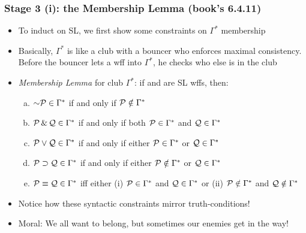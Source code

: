 \begin{frame}
\frametitle{Stage 3 (i): the Membership Lemma (book's 6.4.11)}

\begin{itemize}[<+->]

\item To induct on SL, we first show some constraints on $\Gamma^{\ast}$ membership

\item Basically, $\Gamma^{\ast}$ is like a club with a bouncer who enforces maximal consistency. Before the bouncer lets a wff into $\Gamma^{\ast}$, he checks who else is in the club 

\item \emph{Membership Lemma} for club $\Gamma^{\ast}$: if  and  are SL wffs, then:

\begin{enumerate}[a.)]

\item $\enot \metav{P} \in \Gamma^{\ast}$ if and only if $\mathcal{P} \notin \Gamma^{\ast}$

\item $\mathcal{P} \,\&\, \mathcal{Q} \in \Gamma^{\ast}$ if and only if both $\mathcal{P}\in \Gamma^{\ast}$ and $\mathcal{Q}\in \Gamma^{\ast}$

\item $\mathcal{P} \vee \mathcal{Q} \in \Gamma^{\ast}$ if and only if either $\mathcal{P}\in \Gamma^{\ast}$ or $\mathcal{Q}\in \Gamma^{\ast}$

\item $\mathcal{P} \supset \mathcal{Q} \in \Gamma^{\ast}$ if and only if either $\mathcal{P}\notin \Gamma^{\ast}$ or $\mathcal{Q}\in \Gamma^{\ast}$

\item $\mathcal{P} \equiv \mathcal{Q} \in \Gamma^{\ast}$ iff either (i) $\mathcal{P}\in \Gamma^{\ast}$ and $\mathcal{Q}\in \Gamma^{\ast}$ or (ii) $\mathcal{P}\notin \Gamma^{\ast}$ and $\mathcal{Q}\notin \Gamma^{\ast}$

\end{enumerate}

\item Notice how these syntactic constraints mirror truth-conditions!

\item \footnotesize{Moral: We all want to belong, but sometimes our enemies get in the way!}



\end{itemize}
\end{frame}


